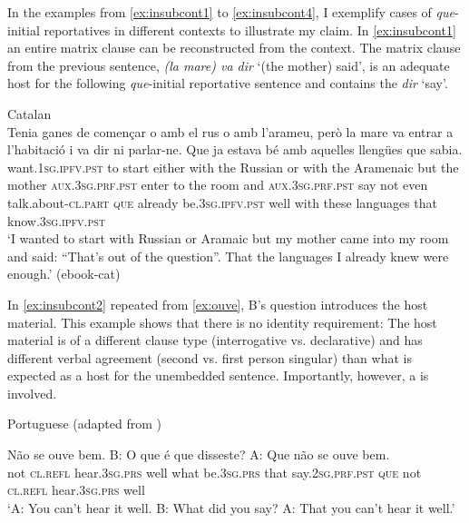 In the examples from \eqref{ex:insubcont1} to \eqref{ex:insubcont4}, I exemplify cases of \emph{que}-initial reportatives in different contexts to illustrate my claim. In \eqref{ex:insubcont1} an entire matrix clause can be reconstructed from the context. The matrix clause from the previous sentence, \emph{(la mare) va dir} `(the mother) said', is an adequate host for the following \emph{que}-initial reportative sentence and contains the \emph{} \emph{dir} `say'.

\ea \label{ex:insubcont1} 
Catalan\\ 
\gll 
	{Tenia ganes} de     començar o amb el rus o amb     l’arameu, però la mare va entrar a     l’habitació i va dir ni parlar-ne.     Que ja estava bé amb aquelles     llengües que sabia. \\
	want.\textsc{1sg.ipfv.pst} to start either with the Russian or with {the Aramenaic} but the mother \textsc{aux.3sg.prf.pst} enter to {the room} and \textsc{aux.3sg.prf.pst} say {not even} talk.about-\textsc{cl.part} \textsc{que} already be.\textsc{3sg.ipfv.pst} well with these languages that know.\textsc{3sg.ipfv.pst} \\
	\glt `I wanted to start with  Russian or Aramaic but my mother came into my room and said: ``That's out of the question''. That the languages I already knew were enough.'  (ebook-cat)
\z

In \eqref{ex:insubcont2} repeated from \eqref{ex:ouve}, B's question introduces the host material. This example shows that there is no identity requirement: The host material is of a different clause type (interrogative vs. declarative) and has different verbal agreement (second vs. first person singular) than what is expected as a host for the unembedded sentence. Importantly, however, a \emph{} is involved.

\ea \label{ex:insubcont2} Portuguese (adapted from \citealt[148: ex 5]{Corr2016})\\ 
\begin{xlist}
 \gll  Não se ouve bem.  B: {O que} é que disseste? A: Que não se ouve bem.  \\
	not \textsc{cl.refl} hear.\textsc{3sg.prs} well
	{} what be.\textsc{3sg.prs} that say.\textsc{2sg.prf.pst} {} \textsc{que} not \textsc{cl.refl} hear.\textsc{3sg.prs} well\\
	\glt `A: You can't hear it well. B: What did you say? A: That you can't hear it well.'
\end{xlist}
\z

